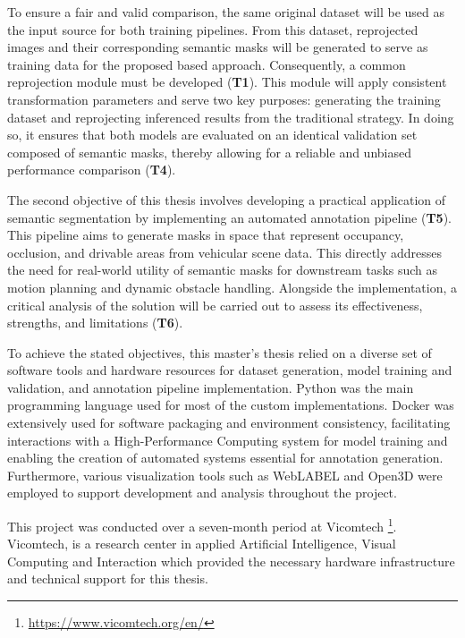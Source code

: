 To ensure a fair and valid comparison, the same original dataset will be used as the input source for both training pipelines. From this dataset,  reprojected images and their corresponding semantic masks will be generated to serve as training data for the proposed  based approach. Consequently, a common  reprojection module must be developed (\textbf{T1}). This module will apply consistent transformation parameters and serve two key purposes: generating the  training dataset and reprojecting inferenced results from the traditional strategy. In doing so, it ensures that both models are evaluated on an identical validation set composed of  semantic masks, thereby allowing for a reliable and unbiased performance comparison (\textbf{T4}).

The second objective of this thesis involves developing a practical application of  semantic segmentation by implementing an automated annotation pipeline (\textbf{T5}). This pipeline aims to generate masks in  space that represent occupancy, occlusion, and drivable areas from vehicular scene data. This directly addresses the need for real-world utility of  semantic masks for downstream tasks such as motion planning and dynamic obstacle handling. Alongside the implementation, a critical analysis of the solution will be carried out to assess its effectiveness, strengths, and limitations (\textbf{T6}).

To achieve the stated objectives, this master's thesis relied on a diverse set of software tools and hardware resources for dataset generation, model training and validation, and annotation pipeline implementation. Python was the main programming language used for most of the custom implementations. Docker was extensively used for software packaging and environment consistency, facilitating interactions with a High-Performance Computing system for model training and enabling the creation of automated systems essential for annotation generation. Furthermore, various visualization tools such as WebLABEL and Open3D were employed to support development and analysis throughout the project.

This project was conducted over a seven-month period at Vicomtech  \footnote{\url{https://www.vicomtech.org/en/}}. Vicomtech, is a research center in applied Artificial Intelligence, Visual Computing and Interaction which provided the necessary hardware infrastructure and technical support for this thesis.



